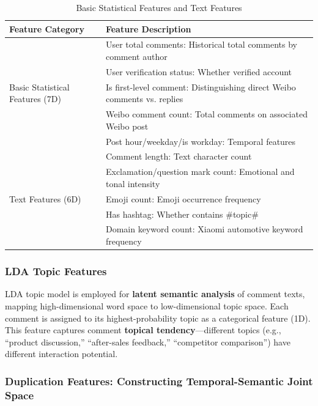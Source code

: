\documentclass[10pt]{article}
\begin{document}
\begin{table}[H]
\centering
\caption{Basic Statistical Features and Text Features}
\label{tab:features}
\begin{tabular}{ll}
\toprule
\textbf{Feature Category} & \textbf{Feature Description} \\
\midrule
\multirow{5}{*}{Basic Statistical Features (7D)}
    & User total comments: Historical total comments by comment author \\
    & User verification status: Whether verified account \\
    & Is first-level comment: Distinguishing direct Weibo comments vs. replies \\
    & Weibo comment count: Total comments on associated Weibo post \\
    & Post hour/weekday/is workday: Temporal features \\
\midrule
\multirow{5}{*}{Text Features (6D)}
    & Comment length: Text character count \\
    & Exclamation/question mark count: Emotional and tonal intensity \\
    & Emoji count: Emoji occurrence frequency \\
    & Has hashtag: Whether contains \#topic\# \\
    & Domain keyword count: Xiaomi automotive keyword frequency \\
\bottomrule
\end{tabular}
\end{table}

\subsubsection{LDA Topic Features}

LDA topic model\cite{blei2003latent} is employed for \textbf{latent semantic analysis} of comment texts, mapping high-dimensional word space to low-dimensional topic space. Each comment is assigned to its highest-probability topic as a categorical feature (1D). This feature captures comment \textbf{topical tendency}---different topics (e.g., ``product discussion,'' ``after-sales feedback,'' ``competitor comparison'') have different interaction potential.

\subsubsection{Duplication Features: Constructing Temporal-Semantic Joint Space}
\end{document}
